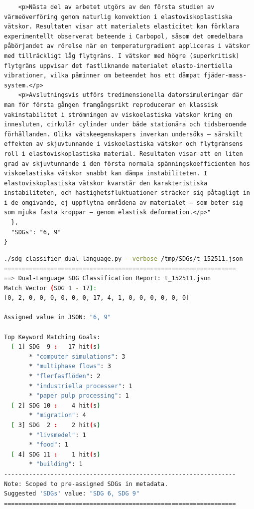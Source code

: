 \begin{casestudySection}
\begin{lstlisting}
    <p>Nästa del av arbetet utgörs av den första studien av värmeöverföring genom naturlig konvektion i elastoviskoplastiska vätskor. Resultaten visar att materialets elasticitet kan förklara experimentellt observerat beteende i Carbopol, såsom det omedelbara påbörjandet av rörelse när en temperaturgradient appliceras i vätskor med tillräckligt låg flytgräns. I vätskor med högre (superkritisk) flytgräns uppvisar det fastliknande materialet elasto-inertiella vibrationer, vilka påminner om beteendet hos ett dämpat fjäder-mass-system.</p>
    <p>Avslutningsvis utförs tredimensionella datorsimuleringar där man för första gången framgångsrikt reproducerar en klassisk vakinstabilitet i strömningen av viskoelastiska vätskor kring en innesluten, cirkulär cylinder under både stationära och tidsberoende förhållanden. Olika vätskeegenskapers inverkan undersöks – särskilt effekten av skjuvtunnande i viskoelastiska vätskor och flytgränsens roll i elastoviskoplastiska material. Resultaten visar att en liten grad av skjuvtunnande i den första normala spänningskoefficienten hos viskoelastiska vätskor snabbt kan dämpa instabiliteten. I elastoviskoplastiska vätskor kvarstår den karakteristiska instabiliteten, och hastighetsfluktuationer sträcker sig påtagligt in i de omgivande, ej uppflytna områdena av materialet – som beter sig som mjuka fasta kroppar – genom elastisk deformation.</p>"
  },
  "SDGs": "6, 9"
}
\end{lstlisting}

\begin{lstlisting}[language={bash}, basicstyle=\footnotesize, escapechar=|, breaklines=true,
    postbreak=\usebox{\lstbreakbox}, caption={Program's output}, label=lst:t_152511Output]
./sdg_classifier_dual_language.py --verbose /tmp/SDGs/t_152511.json
=================================================================
==> Dual-Language SDG Classification Report: t_152511.json
Match Vector (SDG 1 - 17):
[0, 2, 0, 0, 0, 0, 0, 0, 17, 4, 1, 0, 0, 0, 0, 0, 0]

Assigned value in JSON: "6, 9"

Top Keyword Matching Goals:
  [ 1] SDG  9 :   17 hit(s)
       * "computer simulations": 3
       * "multiphase flows": 3
       * "flerfasflöden": 2
       * "industriella processer": 1
       * "paper pulp processing": 1
  [ 2] SDG 10 :    4 hit(s)
       * "migration": 4
  [ 3] SDG  2 :    2 hit(s)
       * "livsmedel": 1
       * "food": 1
  [ 4] SDG 11 :    1 hit(s)
       * "building": 1
-----------------------------------------------------------------
Note: Scoped to pre-assigned SDGs in metadata.
Suggested 'SDGs' value: "SDG 6, SDG 9"
=================================================================
\end{lstlisting}


\end{casestudySection}
